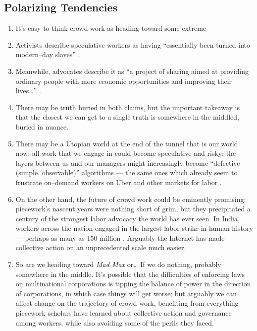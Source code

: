 \documentclass[trackingWork]{subfiles}
\begin{document}
\subsection{Polarizing Tendencies}\label{sec:polarizationOfCrowdWork}
\begin{enumerate}
  \item It's easy to think crowd work as heading toward some extreme
  \item Activists describe speculative workers as having
        ``essentially been turned into modern--day slaves''
        \cite{activistsHuffPoLawsuit}.
  \item Meanwhile, advocates describe it as
        ``a project of sharing
        aimed at providing ordinary people
        with more economic opportunities and
        improving their lives\dots''
        \cite{uberPropaganda}.
  \item There may be truth buried in both claims, but the important takeaway is that
        the closest we can get to a single truth is somewhere in the middled,
        buried in nuance.
  \item There may be a Utopian world at the end of the tunnel that is our world now:
        all work that we engage in could become speculative and risky;
        the layers between us and our managers might increasingly become
        ``defective (simple, observable)'' algorithms \cite{10.2307/2555446}
        --- the same ones which already seem to frustrate
        on--demand workers on Uber and other markets for labor
        \cite{uberAlgorithm,dynamo,turkopticon}.
  \item On the other hand, the future of crowd work could be eminently promising:
        piecework's nascent years were nothing short of grim, but
        they precipitated a century of the strongest labor advocacy the world has ever seen.
        In India, workers across the nation engaged in
        the largest labor strike in human history
        --- perhaps as many as 150 million
        \cite{indiaStrikeRealNews}.
        Arguably the Internet has made collective action on an unprecedented scale much easier.
  \item So are we heading toward \textit{Mad Max} or\dots
        If we do nothing, probably somewhere in the middle.
        It's possible that the difficulties of enforcing laws on multinational corporations is
        tipping the balance of power in the direction of corporations, in which case
        things will get worse;
        but arguably we can affect change on the trajectory of crowd work,
        benefiting from everything piecework scholars have learned about
        collective action and governance
        among workers, while also avoiding some of the perils they faced.
\end{enumerate}
\end{document}

